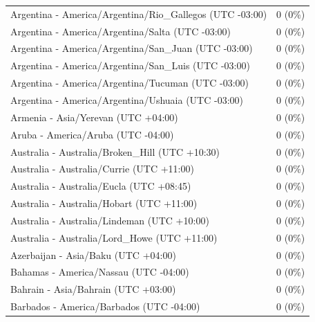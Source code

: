 \begin{appendix}
\begin{table}
{\begin{tabular}[t]{ll}
\addlinespace
\hspace{1em}Argentina - America/Argentina/Rio\_Gallegos (UTC -03:00) & 0 (0\%)\\
\hspace{1em}Argentina - America/Argentina/Salta (UTC -03:00) & 0 (0\%)\\
\hspace{1em}Argentina - America/Argentina/San\_Juan (UTC -03:00) & 0 (0\%)\\
\hspace{1em}Argentina - America/Argentina/San\_Luis (UTC -03:00) & 0 (0\%)\\
\hspace{1em}Argentina - America/Argentina/Tucuman (UTC -03:00) & 0 (0\%)\\
\addlinespace
\hspace{1em}Argentina - America/Argentina/Ushuaia (UTC -03:00) & 0 (0\%)\\
\hspace{1em}Armenia - Asia/Yerevan (UTC +04:00) & 0 (0\%)\\
\hspace{1em}Aruba - America/Aruba (UTC -04:00) & 0 (0\%)\\
\hspace{1em}Australia - Australia/Broken\_Hill (UTC +10:30) & 0 (0\%)\\
\hspace{1em}Australia - Australia/Currie (UTC +11:00) & 0 (0\%)\\
\addlinespace
\hspace{1em}Australia - Australia/Eucla (UTC +08:45) & 0 (0\%)\\
\hspace{1em}Australia - Australia/Hobart (UTC +11:00) & 0 (0\%)\\
\hspace{1em}Australia - Australia/Lindeman (UTC +10:00) & 0 (0\%)\\
\hspace{1em}Australia - Australia/Lord\_Howe (UTC +11:00) & 0 (0\%)\\
\hspace{1em}Azerbaijan - Asia/Baku (UTC +04:00) & 0 (0\%)\\
\addlinespace
\hspace{1em}Bahamas - America/Nassau (UTC -04:00) & 0 (0\%)\\
\hspace{1em}Bahrain - Asia/Bahrain (UTC +03:00) & 0 (0\%)\\
\hspace{1em}Barbados - America/Barbados (UTC -04:00) & 0 (0\%)\\

\end{tabular}}
\end{table}
\end{appendix}
